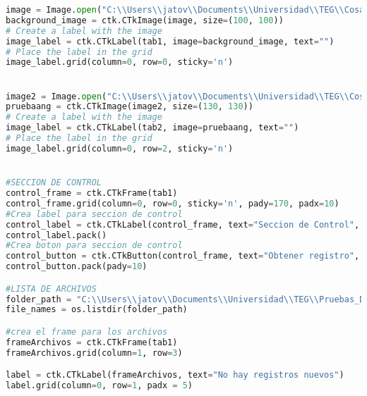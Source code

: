 \begin{lstlisting}[language=Python, caption=Código para interfaz gráfica de control y monitoreo]
image = Image.open("C:\\Users\\jatov\\Documents\\Universidad\\TEG\\CosasTEG_JT\\FFT-Python\\Codigos-Python\\IMME.jpg")
background_image = ctk.CTkImage(image, size=(100, 100))
# Create a label with the image
image_label = ctk.CTkLabel(tab1, image=background_image, text="")
# Place the label in the grid
image_label.grid(column=0, row=0, sticky='n')


image2 = Image.open("C:\\Users\\jatov\\Documents\\Universidad\\TEG\\CosasTEG_JT\\FFT-Python\\Codigos-Python\\angulos.png")
pruebaang = ctk.CTkImage(image2, size=(130, 130))
# Create a label with the image
image_label = ctk.CTkLabel(tab2, image=pruebaang, text="")
# Place the label in the grid
image_label.grid(column=0, row=2, sticky='n')


#SECCION DE CONTROL
control_frame = ctk.CTkFrame(tab1)
control_frame.grid(column=0, row=0, sticky='n', pady=170, padx=10)
#Crea label para seccion de control
control_label = ctk.CTkLabel(control_frame, text="Seccion de Control", font=("Arial", 14, "bold"))
control_label.pack()
#Crea boton para seccion de control
control_button = ctk.CTkButton(control_frame, text="Obtener registro", command=send_mqtt_message)
control_button.pack(pady=10)

#LISTA DE ARCHIVOS
folder_path = "C:\\Users\\jatov\\Documents\\Universidad\\TEG\\Pruebas_DatosAceleracion\\DatosACL_P1"
file_names = os.listdir(folder_path)

#crea el frame para los archivos
frameArchivos = ctk.CTkFrame(tab1)
frameArchivos.grid(column=1, row=3)

label = ctk.CTkLabel(frameArchivos, text="No hay registros nuevos")
label.grid(column=0, row=1, padx = 5)


\end{lstlisting}
